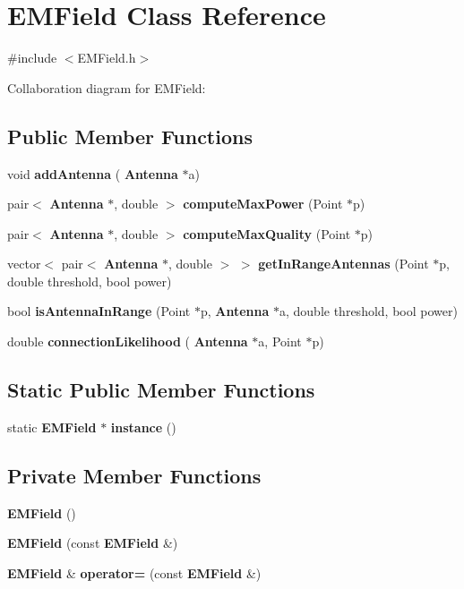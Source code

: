 \section{E\+M\+Field Class Reference}
\label{class_e_m_field}


{\ttfamily \#include $<$E\+M\+Field.\+h$>$}



Collaboration diagram for E\+M\+Field\+:
\subsection*{Public Member Functions}
\begin{DoxyCompactItemize}
\item 
void \textbf{ add\+Antenna} (\textbf{ Antenna} $\ast$a)
\item 
pair$<$ \textbf{ Antenna} $\ast$, double $>$ \textbf{ compute\+Max\+Power} (Point $\ast$p)
\item 
pair$<$ \textbf{ Antenna} $\ast$, double $>$ \textbf{ compute\+Max\+Quality} (Point $\ast$p)
\item 
vector$<$ pair$<$ \textbf{ Antenna} $\ast$, double $>$ $>$ \textbf{ get\+In\+Range\+Antennas} (Point $\ast$p, double threshold, bool power)
\item 
bool \textbf{ is\+Antenna\+In\+Range} (Point $\ast$p, \textbf{ Antenna} $\ast$a, double threshold, bool power)
\item 
double \textbf{ connection\+Likelihood} (\textbf{ Antenna} $\ast$a, Point $\ast$p)
\end{DoxyCompactItemize}
\subsection*{Static Public Member Functions}
\begin{DoxyCompactItemize}
\item 
static \textbf{ E\+M\+Field} $\ast$ \textbf{ instance} ()
\end{DoxyCompactItemize}
\subsection*{Private Member Functions}
\begin{DoxyCompactItemize}
\item 
\textbf{ E\+M\+Field} ()
\item 
\textbf{ E\+M\+Field} (const \textbf{ E\+M\+Field} \&)
\item 
\textbf{ E\+M\+Field} \& \textbf{ operator=} (const \textbf{ E\+M\+Field} \&)
\end{DoxyCompactItemize}
